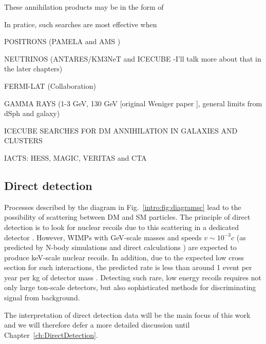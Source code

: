 These annihilation products may be in the form of

In pratice, such searches are most effective when

POSITRONS (PAMELA \cite{Boezio:2009} and AMS \cite{Aguilar:2013})

NEUTRINOS (ANTARES/KM3NeT and ICECUBE \cite{Aartsen:2013b} -I'll talk more about that in the later chapters)

FERMI-LAT (Collaboration) \cite{Ackerman:2012}

GAMMA RAYS (1-3 GeV, 130 GeV [original Weniger paper \cite{Weniger:2012}], general limits from dSph and galaxy)

ICECUBE SEARCHES FOR DM ANNIHILATION IN GALAXIES AND CLUSTERS \cite{Aartsen:2013}

IACTS: HESS, MAGIC, VERITAS and CTA \cite{Doro:2013}




\subsection{Direct detection}

Processes described by the diagram in Fig.~\ref{intro:fig:diagramsc} lead to the possibility of scattering between DM and SM particles. The principle of direct detection is to look for nuclear recoils due to this scattering in a dedicated detector \cite{Goodman,Drukier}. However, WIMPs with GeV-scale masses and speeds $v \sim 10^{-3} c$ (as predicted by N-body simulations \cite{Diemand} and direct calculations \cite{}) are expected to produce keV-scale nuclear recoils. In addition, due to the expected low cross section for such interactions, the predicted rate is less than around 1 event per year per kg of detector mass . Detecting such rare, low energy recoils requires not only large ton-scale detectors, but also sophisticated methods for discriminating signal from background.



The interpretation of direct detection data will be the main focus of this work and we will therefore defer a more detailed discussion until Chapter~\ref{ch:DirectDetection}.


